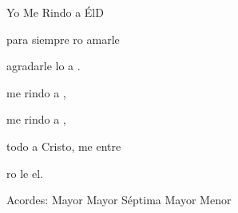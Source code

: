 \documentclass[12pt, spanish]{book}
\begin{document}
\begin{song}{Yo Me Rindo a Él}{D}
\begin{SBExtraKeys}
{\begin{SBOpGroup}
                para siempre ro amarle

                 agradarle lo a .
            \end{SBOpGroup}

            \begin{SBChorus}
                 me rindo a ,

                 me rindo a ,

                todo a Cristo,  me entre

                ro le el.
            \end{SBChorus}

            \ifChordBk
            \begin{SBOpGroup}
                Acordes:\break
                 Mayor \hfill
                 Mayor S\'eptima \hfill\null\break
                 Mayor \hfill
                 Menor \hfill\null\break
            \end{SBOpGroup}
            \fi
        }\end{SBExtraKeys}
    \end{song}
\end{document}
